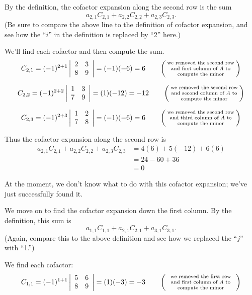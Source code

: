 {By the definition, the cofactor expansion along the second row is the sum 
$$a_{2,1}C_{2,1} + a_{2,2}C_{2,2} + a_{2,3}C_{2,3}.$$
(Be sure to compare the above line to the definition of cofactor expansion, and see how the ``$i$'' in the definition is replaced by ``2'' here.)

We'll find each cofactor and then compute the sum.
$$C_{2,1} = (-1)^{2+1}\bdt{cc}2&3\\8&9\edt  = (-1)(-6) = 6 \quad\quad \left(\parbox{100pt}{\centering\scriptsize we removed the second row and first column of \tta\ to compute the minor}\right)$$

$$C_{2,2} = (-1)^{2+2}\bdt{cc}1&3\\7&9\edt = (1)(-12) = -12 \quad\quad \left(\parbox{100pt}{\centering\scriptsize we removed the second row and second column of \tta\ to compute the minor}\right)$$

$$C_{2,3} = (-1)^{2+3}\bdt{cc}1&2\\7&8\edt = (-1)(-6) = 6 \quad\quad \left(\parbox{100pt}{\centering\scriptsize we removed  the second row and third column of \tta\ to compute the minor}\right)$$


Thus the cofactor expansion along the second row is
\begin{align*}
a_{2,1}C_{2,1} + a_{2,2}C_{2,2} + a_{2,3}C_{2,3} &= 4(6) + 5(-12) + 6(6) \\
&= 24-60+36\\
&= 0
\end{align*}

At the moment, we don't know what to do with this cofactor expansion; we've just successfully found it.

We move on to find the cofactor expansion down the first column. By the definition, this sum is
$$a_{1,1}C_{1,1} + a_{2,1}C_{2,1} + a_{3,1}C_{3,1}.$$
(Again, compare this to the above definition and see how we replaced the ``$j$'' with ``1.'')

We find each cofactor:
$$C_{1,1} = (-1)^{1+1}\bdt{cc}5&6\\8&9\edt = (1)(-3) = -3 \quad\quad \left(\parbox{100pt}{\centering\scriptsize we removed  the first row and first column of \tta\ to compute the minor}\right)$$

}

